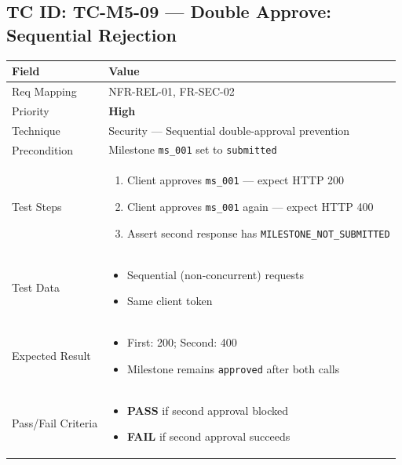 \documentclass[12pt,a4paper]{article}
\newcommand{\sevhigh}{\textcolor{severityhigh}{\textbf{High}}}
\newcommand{\passresult}{\textcolor{passgreen}{\textbf{PASS}}}
\newcommand{\failresult}{\textcolor{failred}{\textbf{FAIL}}}
\begin{document}
\vspace{0.8cm}

\subsection{TC ID: TC-M5-09 --- Double Approve: Sequential Rejection}

\begin{tabular}{|p{}|p{}|}
\hline
\rowcolor{lightblue} \textbf{Field} & \textbf{Value} \\
\hline
Req Mapping & NFR-REL-01, FR-SEC-02 \\
\hline
Priority & \sevhigh \\
\hline
Technique & Security --- Sequential double-approval prevention \\
\hline
Precondition & Milestone \texttt{ms\_001} set to \texttt{submitted} \\
\hline
Test Steps &
\begin{enumerate}[nosep, leftmargin=*]
  \item Client approves \texttt{ms\_001} --- expect HTTP 200
  \item Client approves \texttt{ms\_001} again --- expect HTTP 400
  \item Assert second response has \texttt{MILESTONE\_NOT\_SUBMITTED}
\end{enumerate} \\
\hline
Test Data &
\begin{itemize}[nosep, leftmargin=*]
  \item Sequential (non-concurrent) requests
  \item Same client token
\end{itemize} \\
\hline
Expected Result &
\begin{itemize}[nosep, leftmargin=*]
  \item First: 200; Second: 400
  \item Milestone remains \texttt{approved} after both calls
\end{itemize} \\
\hline
Pass/Fail Criteria &
\begin{itemize}[nosep, leftmargin=*]
  \item \passresult{} if second approval blocked
  \item \failresult{} if second approval succeeds
\end{itemize} \\
\hline
\end{tabular}
\end{document}
